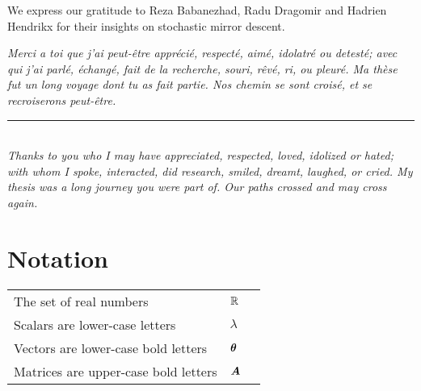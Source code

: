 \documentclass[12pt]{report} %
\numberwithin{equation}{chapter}
\numberwithin{table}{chapter}
\numberwithin{figure}{chapter}
\begin{document}
We express our gratitude to Reza Babanezhad, Radu Dragomir and Hadrien Hendrikx for their insights on stochastic mirror descent. 

\emph{
Merci a toi que j'ai peut-être apprécié, respecté, aimé, idolatré ou detesté; avec qui j'ai parlé, échangé, fait de la recherche, souri, rêvé, ri, ou pleuré. Ma thèse fut un long voyage dont tu as fait partie. Nos chemin se sont croisé, et se recroiserons peut-être.}\\
\rule{4cm}{0.4pt} \\
\emph{Thanks to you who I may have appreciated, respected, loved, idolized or hated; with whom I spoke, interacted, did research, smiled, dreamt, laughed, or cried. My thesis was a long journey you were part of. Our paths crossed and may cross again.}\\



\cleardoublepage

\chapter*{Notation}

\begin{tabular}{lll}
  The set of real numbers \dotfill & $\mathbb{R}$ \\
  Scalars are lower-case letters \dotfill & $\lambda$       \\
  Vectors are lower-case bold letters  \dotfill & ${\bm{\theta}}$\\
  Matrices are upper-case bold letters\dotfill &  ${\bm{A}}$ \\
 \end{tabular} 
\newpage

\setcounter{page}{1}
%



\end{document}
